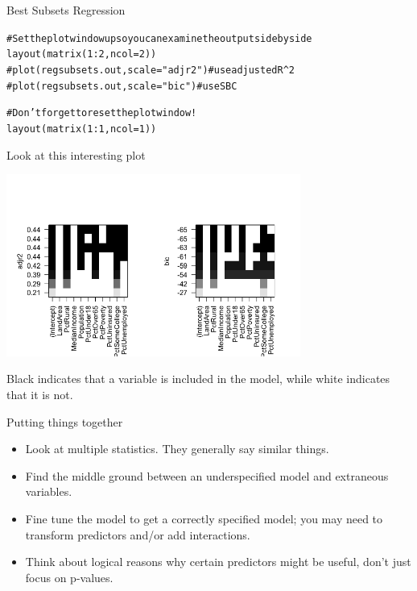 \documentclass{beamer}\usepackage[]{graphicx}\usepackage[]{color}
\makeatletter
\newcommand{\hlnum}[1]{\textcolor[rgb]{0.824,0.412,0.118}{#1}}%
\newcommand{\hlcom}[1]{\textcolor[rgb]{0.824,0.706,0.549}{#1}}%
\newcommand{\hlopt}[1]{\textcolor[rgb]{1,0.894,0.769}{#1}}%
\newcommand{\hlstd}[1]{\textcolor[rgb]{1,0.894,0.769}{#1}}%
\newcommand{\hlkwc}[1]{\textcolor[rgb]{0.78,0.941,0.545}{#1}}%
\newcommand{\hlkwd}[1]{\textcolor[rgb]{1,0.78,0.769}{#1}}%
\newenvironment{kframe}{%
 \def\at@end@of@kframe{}%
 \ifinner\ifhmode%
  \def\at@end@of@kframe{\end{minipage}}%
  \begin{minipage}{\columnwidth}%
 \fi\fi%
 \def\FrameCommand##1{\hskip\@totalleftmargin \hskip-\fboxsep
 \colorbox{shadecolor}{##1}\hskip-\fboxsep
     \hskip-\linewidth \hskip-\@totalleftmargin \hskip\columnwidth}%
 \MakeFramed {\advance\hsize-\width
   \@totalleftmargin\z@ \linewidth\hsize
   \@setminipage}}%
 {\par\unskip\endMakeFramed%
 \at@end@of@kframe}
\newenvironment{knitrout}{}{} %
\makeatother
\begin{document}
\begin{darkframes}
\begin{frame}[fragile]{Best Subsets Regression}
\begin{knitrout}
\begin{kframe}
\begin{alltt}
\hlcom{# Set the plot window up so you can examine the output side by side}
\hlkwd{layout}\hlstd{(}\hlkwd{matrix}\hlstd{(}\hlnum{1}\hlopt{:}\hlnum{2}\hlstd{,} \hlkwc{ncol}\hlstd{=}\hlnum{2}\hlstd{))}
\hlcom{#plot(regsubsets.out, scale="adjr2")  # use adjusted R^2}
\hlcom{#plot(regsubsets.out, scale="bic")    # use SBC}

\hlcom{# Don't forget to reset the plot window!}
\hlkwd{layout}\hlstd{(}\hlkwd{matrix}\hlstd{(}\hlnum{1}\hlopt{:}\hlnum{1}\hlstd{,} \hlkwc{ncol}\hlstd{=}\hlnum{1}\hlstd{))}
\end{alltt}
\end{kframe}
\end{knitrout}

    \end{frame}

    \begin{frame}{Look at this interesting plot}
    \fontsize{8}{8}\selectfont
      \begin{center}
        \includegraphics[width=3.8in]{bestsubsets} \\
      \end{center} 

      \begin{center}
        {Black indicates that a variable is included in the model, while white indicates that it is not.}
      \end{center} 
      
    \end{frame}


    \begin{frame}[fragile]{Putting things together}
      \begin{itemize}[<+->]
        \item Look at multiple statistics. They generally say similar things.
        \item Find the middle ground between an underspecified model and extraneous variables.
        \item Fine tune the model to get a correctly specified model; you may need to transform predictors and/or add interactions.
        \item Think about logical reasons why certain predictors might be useful, don't just focus on p-values.
      \end{itemize} 
    \end{frame}



\end{darkframes}
\end{document}
